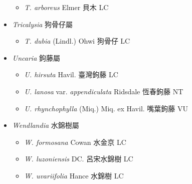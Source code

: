 \begin{itemize}
  \begin{itemize}
        \item[] \textit{T. arboreus} Elmer  貝木   LC
  \end{itemize}
 \item[] \textit{Tricalysia} 狗骨仔屬
                                
  \begin{itemize}
        \item[] \textit{T. dubia} (Lindl.) Ohwi  狗骨仔   LC
  \end{itemize}
 \item[] \textit{Uncaria} 鉤藤屬
                                
  \begin{itemize}
        \item[] \textit{U. hirsuta} Havil.  臺灣鉤藤   LC
        \item[] \textit{U. lanosa} var. \textit{appendiculata} Ridsdale  恆春鉤藤   NT
        \item[] \textit{U. rhynchophylla} (Miq.) Miq. ex Havil.  嘴葉鉤藤   VU
  \end{itemize}
 \item[] \textit{Wendlandia} 水錦樹屬
                                
  \begin{itemize}
        \item[] \textit{W. formosana} Cowan  水金京   LC
        \item[] \textit{W. luzoniensis} DC.  呂宋水錦樹   LC
        \item[] \textit{W. uvariifolia} Hance  水錦樹   LC
  \end{itemize}
  \end{itemize}
